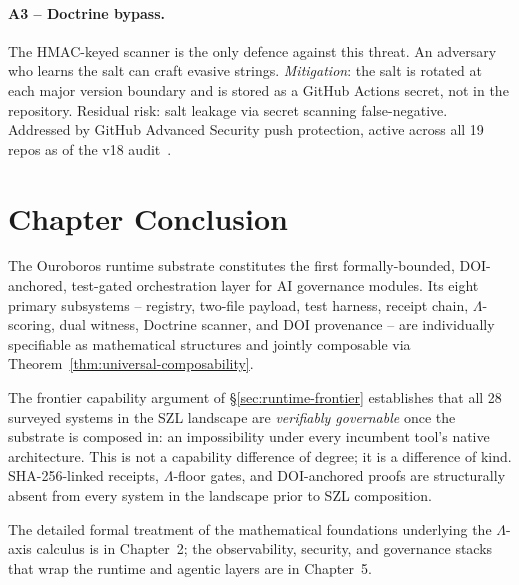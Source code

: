 \paragraph{A3 -- Doctrine bypass.}
The HMAC-keyed scanner is the only defence against this threat.  An
adversary who learns the salt can craft evasive strings.  \emph{Mitigation}:
the salt is rotated at each major version boundary and is stored as a
GitHub Actions secret, not in the repository.  Residual risk: salt leakage
via secret scanning false-negative.  Addressed by GitHub Advanced Security
push protection, active across all 19 repos as of the v18 audit~\cite{szl_zoom_out_v18}.

\section{Chapter Conclusion}
\label{sec:runtime-conclusion}

The Ouroboros runtime substrate constitutes the first formally-bounded,
DOI-anchored, test-gated orchestration layer for AI governance modules.
Its eight primary subsystems -- registry, two-file payload, test harness,
receipt chain, $\Lambda$-scoring, dual witness, Doctrine scanner, and DOI
provenance -- are individually specifiable as mathematical structures and
jointly composable via Theorem~\ref{thm:universal-composability}.

The frontier capability argument of \S\ref{sec:runtime-frontier} establishes
that all 28 surveyed systems in the SZL landscape are \emph{verifiably
governable} once the substrate is composed in: an impossibility under every
incumbent tool's native architecture.  This is not a capability difference
of degree; it is a difference of kind.  SHA-256-linked receipts, $\Lambda$-floor
gates, and DOI-anchored proofs are structurally absent from every system
in the landscape prior to SZL composition.

The detailed formal treatment of the mathematical foundations underlying the
$\Lambda$-axis calculus is in Chapter~2; the observability, security, and
governance stacks that wrap the runtime and agentic layers are in Chapter~5.
